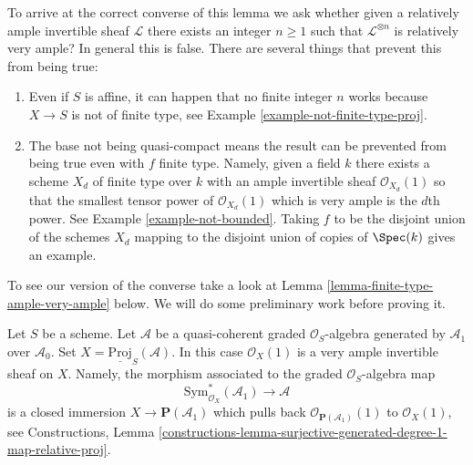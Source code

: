 \noindent
To arrive at the correct converse of this lemma we ask
whether given a relatively ample
invertible sheaf $\mathcal{L}$ there exists an integer $n \geq 1$ such
that $\mathcal{L}^{\otimes n}$ is relatively very ample? In general this
is false. There are several things that prevent this from being true:
\begin{enumerate}
\item Even if $S$ is affine, it can happen that no finite integer
$n$ works because $X \to S$ is not of finite type, see
Example \ref{example-not-finite-type-proj}.
\item The base not being quasi-compact means the result can be
prevented from being true even with $f$ finite type. Namely, given
a field $k$ there exists a scheme $X_d$ of finite type over $k$ with
an ample invertible sheaf $\mathcal{O}_{X_d}(1)$ so that the smallest
tensor power of $\mathcal{O}_{X_d}(1)$ which is very ample is the $d$th
power. See Example \ref{example-not-bounded}.
Taking $f$ to be the disjoint union of the schemes $X_d$ mapping
to the disjoint union of copies of $\Spec(k)$ gives an example.
\end{enumerate}
To see our version of the converse take a look at
Lemma \ref{lemma-finite-type-ample-very-ample} below.
We will do some preliminary work before proving it.

\begin{example}
\label{example-very-ample}
Let $S$ be a scheme. Let $\mathcal{A}$ be a quasi-coherent graded
$\mathcal{O}_S$-algebra generated by $\mathcal{A}_1$ over $\mathcal{A}_0$.
Set $X = \underline{\text{Proj}}_S(\mathcal{A})$. In this case
$\mathcal{O}_X(1)$ is a very ample invertible sheaf on $X$. Namely,
the morphism associated to the graded $\mathcal{O}_S$-algebra map
$$
\text{Sym}_{\mathcal{O}_X}^*(\mathcal{A}_1)
\longrightarrow
\mathcal{A}
$$
is a closed immersion $X \to \mathbf{P}(\mathcal{A}_1)$ which pulls back
$\mathcal{O}_{\mathbf{P}(\mathcal{A}_1)}(1)$ to $\mathcal{O}_X(1)$, see
Constructions, Lemma
\ref{constructions-lemma-surjective-generated-degree-1-map-relative-proj}.
\end{example}

